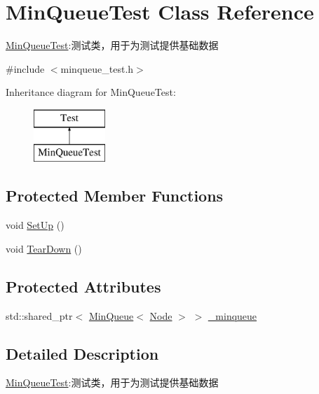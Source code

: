 \hypertarget{class_min_queue_test}{}\section{Min\+Queue\+Test Class Reference}
\label{class_min_queue_test}


\hyperlink{class_min_queue_test}{Min\+Queue\+Test}\+:测试类，用于为测试提供基础数据  




{\ttfamily \#include $<$minqueue\+\_\+test.\+h$>$}

Inheritance diagram for Min\+Queue\+Test\+:\begin{figure}[H]
\begin{center}
\leavevmode
\includegraphics[height=2.000000cm]{class_min_queue_test}
\end{center}
\end{figure}
\subsection*{Protected Member Functions}
\begin{DoxyCompactItemize}
\item 
void \hyperlink{class_min_queue_test_ae801d45bf78b7bb80b278264d3a8e96a}{Set\+Up} ()
\item 
void \hyperlink{class_min_queue_test_a3e949d54ecada54f713ff47d80eb513c}{Tear\+Down} ()
\end{DoxyCompactItemize}
\subsection*{Protected Attributes}
\begin{DoxyCompactItemize}
\item 
std\+::shared\+\_\+ptr$<$ \hyperlink{class_introduction_to_algorithm_1_1_queue_algorithm_1_1_min_queue}{Min\+Queue}$<$ \hyperlink{struct_node}{Node} $>$ $>$ \hyperlink{class_min_queue_test_a372d59dab9f706027a6be031a1ab99dc}{\+\_\+minqueue}
\end{DoxyCompactItemize}


\subsection{Detailed Description}
\hyperlink{class_min_queue_test}{Min\+Queue\+Test}\+:测试类，用于为测试提供基础数据 

